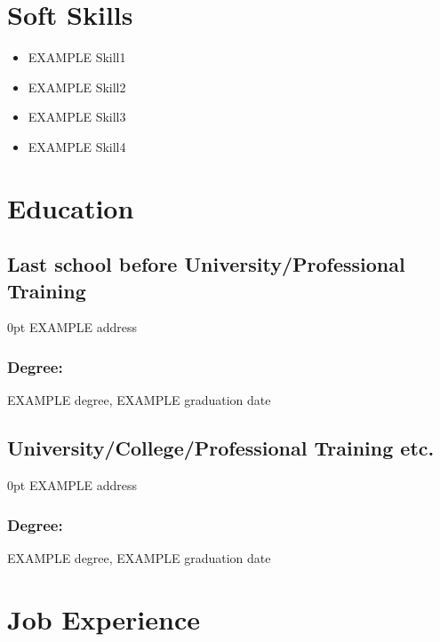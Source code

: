 \documentclass[a4paper,11pt]{article}
\newlength{\myindent}
\begin{document}
\section{ Soft Skills}
    \begin{itemize}
        \item EXAMPLE Skill1
        \item EXAMPLE Skill2
        \item EXAMPLE Skill3
        \item EXAMPLE Skill4
    \end{itemize}
        \vspace{-1.3em}

\section{ Education}
    \subsection{Last school before University/Professional Training}
        \begin{addmargin}[\myindent]{0pt}
            EXAMPLE address
        \end{addmargin}
        \vspace{-.8em}
        \subsubsection{Degree:}
            EXAMPLE degree, EXAMPLE graduation date
            \vspace{-.25em}
    \subsection{University/College/Professional Training etc.}
        \begin{addmargin}[\myindent]{0pt}
            EXAMPLE address
        \end{addmargin}
        \vspace{-.8em}
        \subsubsection{Degree:}
            EXAMPLE degree, EXAMPLE graduation date
            \vspace{-.25em}

\section{ Job Experience}
\end{document}
